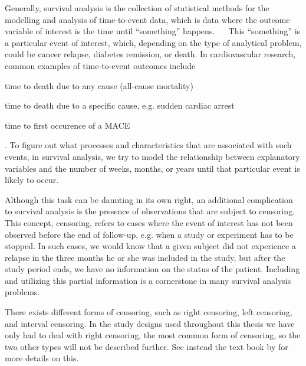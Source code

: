 Generally, 
survival analysis is the collection of statistical methods
for the modelling and analysis of time-to-event data,
which is data where the outcome variable of interest 
is the time until \enquote{something} happens.~%
~\autocite{kleinbaumSurvival2011}
This \enquote{something} is a particular event of interest,
which, depending on the type of analytical problem, 
could be cancer relapse, 
diabetes remission,
or death.
In cardiovascular research, 
common examples of time-to-event outcomes include
\begin{enumerate*}
    \item time to death due to any cause (all-cause mortality)
    \item time to death due to a specific cause,
        e.g. sudden cardiac arrest
    \item time to first occurence of a \ac{MACE}
\end{enumerate*}.
To figure out what processes and characteristics 
that are associated with such events, 
in survival analysis, we try to model the relationship between
explanatory variables and the number of weeks, months, or years 
until that particular event is likely to occur. 


Although this task can be daunting in its own right, 
an additional complication to survival analysis 
is the presence of observations that are subject to 
censoring.
This concept, censoring, refers to cases 
where the event of interest has not been observed 
before the end of follow-up, 
e.g. when a study or experiment has to be stopped.
In such cases, 
we would know that a given subject did not experience a relapse 
in the three months he or she was included in the study, 
but after the study period ends, 
we have no information on the status of the patient. 
Including and utilizing this partial information
is a cornerstone in many survival analysis problems.

There exists different forms of censoring,
such as right censoring, left censoring, and interval censoring.
In the study designs used throughout this thesis 
we have only had to deal with right censoring,
the most common form of censoring,
so the two other types will not be described further.
See instead the text book by \citeauthor{kleinSurvival2003} 
for more details on this.
~\autocite{kleinSurvival2003}


